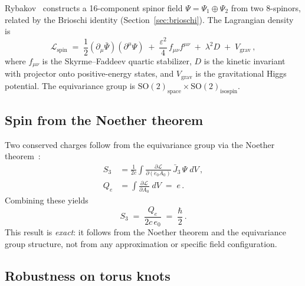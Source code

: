 \documentclass[11pt]{article}
\begin{document}
Rybakov~\cite{Rybakov2016,Rybakov2015} constructs a 16-component
spinor field $\Psi = \Psi_1 \oplus \Psi_2$ from two 8-spinors,
related by the Brioschi identity (Section~\ref{sec:brioschi}).
The Lagrangian density is~\cite{Rybakov2016}
\begin{equation}
\label{eq:rybakov_lagrangian}
\mathcal{L}_\text{spin} \;=\;
    \frac{1}{2}(\partial_\mu\bar{\Psi})(\partial^\mu\Psi)
    \;+\; \frac{\varepsilon^2}{4}\,f_{\mu\nu}f^{\mu\nu}
    \;+\; \lambda^2 D \;+\; V_\text{grav}\,,
\end{equation}
where $f_{\mu\nu}$ is the Skyrme--Faddeev quartic stabilizer,
$D$ is the kinetic invariant with projector onto positive-energy
states, and $V_\text{grav}$ is the gravitational Higgs potential.
The equivariance group is $\mathrm{SO}(2)_\text{space} \times
\mathrm{SO}(2)_\text{isospin}$.

\subsection{Spin from the Noether theorem}

Two conserved charges follow from the equivariance group via
the Noether theorem~\cite{Rybakov2025a}:
\begin{align}
S_3 &= \frac{1}{2c}\int \frac{\partial\mathcal{L}}
    {\partial(\dot{e}_0 A_0)}\,\bar{J}_3\,\Psi\;dV\,,
    \label{eq:spin} \\
Q_e &= \int \frac{\partial\mathcal{L}}{\partial A_0}\;dV \;=\; e\,.
    \label{eq:charge}
\end{align}
Combining these yields
\begin{equation}
\boxed{\;S_3 \;=\; \frac{Q_e}{2c\,e_0} \;=\; \frac{\hbar}{2}\,.\;}
\label{eq:spin_half}
\end{equation}
This result is \emph{exact}: it follows from the Noether theorem and
the equivariance group structure, not from any approximation or
specific field configuration.

\subsection{Robustness on torus knots}
\end{document}
